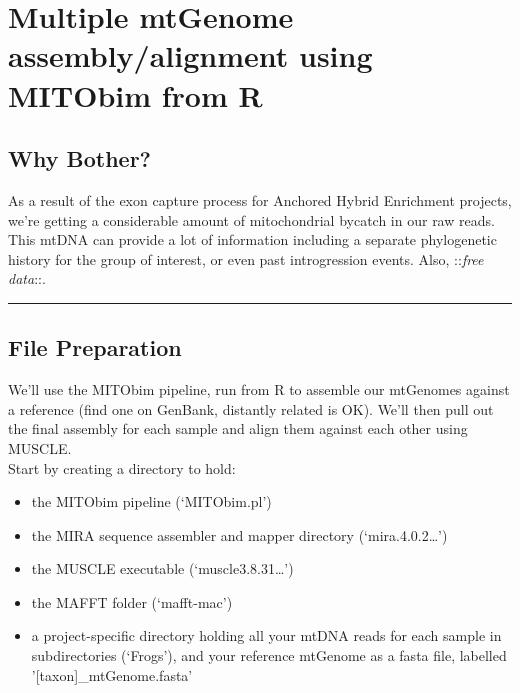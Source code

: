 \documentclass[
]{article}
\providecommand{\tightlist}{%
  \setlength{\itemsep}{0pt}\setlength{\parskip}{0pt}}
\begin{document}
\pagebreak

\hypertarget{multiple-mtgenome-assemblyalignment-using-mitobim-from-r}{%
\section{Multiple mtGenome assembly/alignment using MITObim from
R}\label{multiple-mtgenome-assemblyalignment-using-mitobim-from-r}}

\hypertarget{why-bother}{%
\subsection{Why Bother?}\label{why-bother}}

As a result of the exon capture process for Anchored Hybrid Enrichment
projects, we're getting a considerable amount of mitochondrial bycatch
in our raw reads. This mtDNA can provide a lot of information including
a separate phylogenetic history for the group of interest, or even past
introgression events. Also, ::\emph{free data}::.

\begin{center}\rule{0.5\linewidth}{0.5pt}\end{center}

\hypertarget{file-preparation}{%
\subsection{File Preparation}\label{file-preparation}}

We'll use the MITObim pipeline, run from R to assemble our mtGenomes
against a reference (find one on GenBank, distantly related is OK).
We'll then pull out the final assembly for each sample and align them
against each other using MUSCLE.\\
Start by creating a directory to hold:

\begin{itemize}
\tightlist
\item
  the MITObim pipeline (`MITObim.pl')\\
\item
  the MIRA sequence assembler and mapper directory
  (`mira.4.0.2\ldots{}')\\
\item
  the MUSCLE executable (`muscle3.8.31\ldots{}')
\item
  the MAFFT folder (`mafft-mac')
\item
  a project-specific directory holding all your mtDNA reads for each
  sample in subdirectories (`Frogs'), and your reference mtGenome as a
  fasta file, labelled '{[}taxon{]}\_mtGenome.fasta'
\end{itemize}
\end{document}
